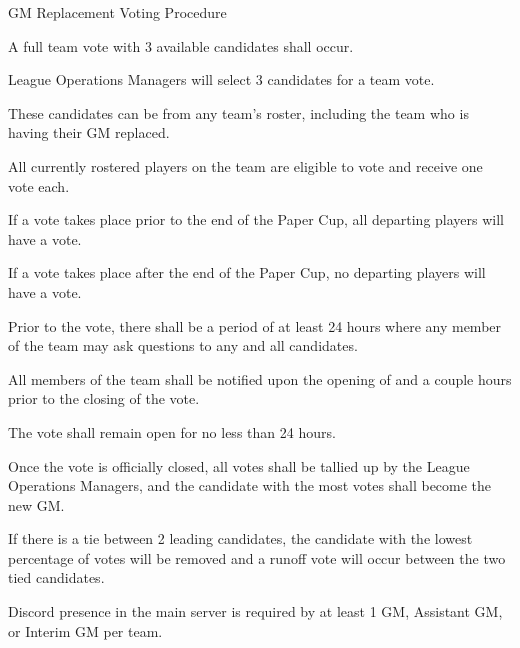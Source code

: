 	\item GM Replacement Voting Procedure
	\begin{deepEnumerate}
		\item A full team vote with 3 available candidates shall occur.
		\begin{deepEnumerate}
			\item League Operations Managers will select 3 candidates for a team vote.
			\begin{deepEnumerate}
				\item These candidates can be from any team’s roster, including the team who is having their GM replaced.
			\end{deepEnumerate}
			\item All currently rostered players on the team are eligible to vote and receive one vote each.
			\begin{deepEnumerate}
				\item If a vote takes place prior to the end of the Paper Cup, all departing players will have a vote.
				\item If a vote takes place after the end of the Paper Cup, no departing players will have a vote. 
			\end{deepEnumerate}
			\item Prior to the vote, there shall be a period of at least 24 hours where any member of the team may ask questions to any and all candidates.
			\item All members of the team shall be notified upon the opening of and a couple hours prior to the closing of the vote.
			\begin{deepEnumerate}
				\item The vote shall remain open for no less than 24 hours.
			\end{deepEnumerate}
			\item Once the vote is officially closed, all votes shall be tallied up by the League Operations Managers, and the candidate with the most votes shall become the new GM.
			\begin{deepEnumerate}
				\item If there is a tie between 2 leading candidates, the candidate with the lowest percentage of votes will be removed and a runoff vote will occur between the two tied candidates.
			\end{deepEnumerate}
		\end{deepEnumerate}
	\end{deepEnumerate}
	\item Discord presence in the main server is required by at least 1 GM, Assistant GM, or Interim GM per team. 
